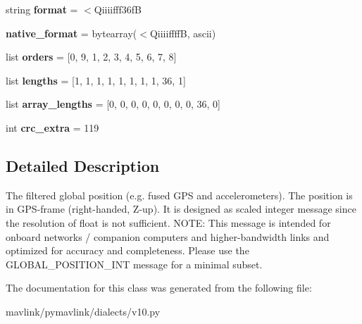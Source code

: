 \begin{DoxyCompactItemize}
\item 
\mbox{\label{classpymavlink_1_1dialects_1_1v10_1_1MAVLink__global__position__int__cov__message_a75850c43e93a9925364e923504b86445}} 
string {\bfseries format} = \textquotesingle{}$<$Qiiiifff36fB\textquotesingle{}
\item 
\mbox{\label{classpymavlink_1_1dialects_1_1v10_1_1MAVLink__global__position__int__cov__message_a6a26f57ea8aebaa36628c5676b045cc8}} 
{\bfseries native\+\_\+format} = bytearray(\textquotesingle{}$<$QiiiiffffB\textquotesingle{}, \textquotesingle{}ascii\textquotesingle{})
\item 
\mbox{\label{classpymavlink_1_1dialects_1_1v10_1_1MAVLink__global__position__int__cov__message_a54c6fd4345a665f3311790d67278ad71}} 
list {\bfseries orders} = \mbox{[}0, 9, 1, 2, 3, 4, 5, 6, 7, 8\mbox{]}
\item 
\mbox{\label{classpymavlink_1_1dialects_1_1v10_1_1MAVLink__global__position__int__cov__message_a9614943cf6ca3d9178504c0cf8f669df}} 
list {\bfseries lengths} = \mbox{[}1, 1, 1, 1, 1, 1, 1, 1, 36, 1\mbox{]}
\item 
\mbox{\label{classpymavlink_1_1dialects_1_1v10_1_1MAVLink__global__position__int__cov__message_af467eac3320f2fbe32dddaa98bdbed6e}} 
list {\bfseries array\+\_\+lengths} = \mbox{[}0, 0, 0, 0, 0, 0, 0, 0, 36, 0\mbox{]}
\item 
\mbox{\label{classpymavlink_1_1dialects_1_1v10_1_1MAVLink__global__position__int__cov__message_a3b045d2706ad06cc82b5b4fd53d4d7c3}} 
int {\bfseries crc\+\_\+extra} = 119
\end{DoxyCompactItemize}


\subsection{Detailed Description}
\begin{DoxyVerb}The filtered global position (e.g. fused GPS and
accelerometers). The position is in GPS-frame (right-handed,
Z-up). It  is designed as scaled integer message since the
resolution of float is not sufficient. NOTE: This message is
intended for onboard networks / companion computers and
higher-bandwidth links and optimized for accuracy and
completeness. Please use the GLOBAL_POSITION_INT message for a
minimal subset.
\end{DoxyVerb}
 

The documentation for this class was generated from the following file\+:\begin{DoxyCompactItemize}
\item 
mavlink/pymavlink/dialects/v10.\+py\end{DoxyCompactItemize}
